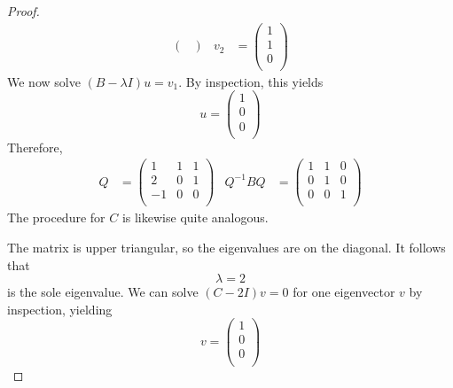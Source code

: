 \documentclass[../psets.tex]{subfiles}
\begin{document}
\begin{enumerate}
\begin{proof}
\begin{align*}
\begin{pmatrix}
            \end{pmatrix}&
            v_2 &=
            \begin{pmatrix}
                1\\
                1\\
                0\\
            \end{pmatrix}
        \end{align*}
        We now solve $(B-\lambda I)u=v_1$. By inspection, this yields
        \begin{equation*}
            u =
            \begin{pmatrix}
                1\\
                0\\
                0\\
            \end{pmatrix}
        \end{equation*}
        Therefore,
        \begin{align*}
            Q &=
            \begin{pmatrix}
                1 & 1 & 1\\
                2 & 0 & 1\\
                -1 & 0 & 0\\
            \end{pmatrix}&
            Q^{-1}BQ &=
            \begin{pmatrix}
                1 & 1 & 0\\
                0 & 1 & 0\\
                0 & 0 & 1\\
            \end{pmatrix}
        \end{align*}
        The procedure for $C$ is likewise quite analogous.\par
        The matrix is upper triangular, so the eigenvalues are on the diagonal. It follows that
        \begin{equation*}
            \lambda = 2
        \end{equation*}
        is the sole eigenvalue. We can solve $(C-2I)v=0$ for one eigenvector $v$ by inspection, yielding
        \begin{equation*}
            v =
            \begin{pmatrix}
                1\\
                0\\
                0\\

\end{pmatrix}
\end{equation*}
\end{proof}
\end{enumerate}
\end{document}

